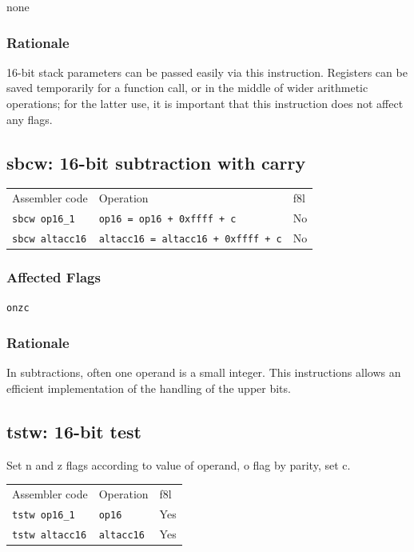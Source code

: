 \documentclass{book}
\begin{document}
none

\subsubsection*{Rationale}

16-bit stack parameters can be passed easily via this instruction. Registers can be saved temporarily for a function call, or in the middle of wider arithmetic operations; for the latter use, it is important that this instruction does not affect any flags.


\subsection{sbcw: 16-bit subtraction with carry}

\begin{tabular}{l l l}
Assembler code         & Operation                                 & f8l \\
\texttt{sbcw op16\_1}  & \texttt{op16 = op16 + 0xffff + c}         & No \\
\texttt{sbcw altacc16} & \texttt{altacc16 = altacc16 + 0xffff + c} & No
\end{tabular}

\subsubsection*{Affected Flags}

\texttt{onzc}

\subsubsection*{Rationale}

In subtractions, often one operand is a small integer. This instructions allows an efficient implementation of the handling of the upper bits.


\subsection{tstw: 16-bit test}

Set n and z flags according to value of operand, o flag by parity, set c.

\begin{tabular}{l l l}
Assembler code         & Operation         & f8l \\
\texttt{tstw op16\_1}  & \texttt{op16}     & Yes \\
\texttt{tstw altacc16} & \texttt{altacc16} & Yes
\end{tabular}
\end{document}
